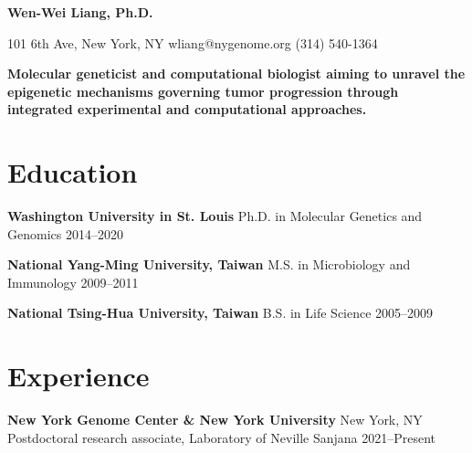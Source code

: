 \documentclass[letterpaper,11pt]{cv}
\begin{document}

\begin{minipage}[b][][c]{35em}
    \lightsourceserif\Huge\bfseries\color{color-title}
    Wen-Wei Liang, Ph.D.
\end{minipage}%
\hfill
\hspace{1em}
\begin{minipage}[b][][b]{11em}
    \raggedleft
    \small
    101 6th Ave, New York, NY \hfill
    {wliang@nygenome.org} \hfill
    (314) 540-1364
\end{minipage}

\vspace{2ex}

{
    \small\lightsourceserif\bfseries\color{color-title}
    Molecular geneticist and computational biologist aiming to unravel the epigenetic mechanisms governing tumor progression through integrated experimental and computational approaches.\par
}

\section{Education}

\begin{entrylist}

\item \textbf{Washington University in St. Louis} \hspace{2.45em} Ph.D. in Molecular Genetics and Genomics \hfill
    2014--2020

\item \textbf{National Yang-Ming University, Taiwan} \hspace{0.5em} M.S. in Microbiology and Immunology \hfill
    2009--2011

\item \textbf{National Tsing-Hua University, Taiwan} \hspace{0.72em} B.S. in Life Science \hfill
    2005--2009

\end{entrylist}

\section{Experience}
\textbf{New York Genome Center \& New York University}
\hfill New York, NY\\
Postdoctoral research associate, {Laboratory of Neville Sanjana } \hfill
2021--Present
\end{document}
